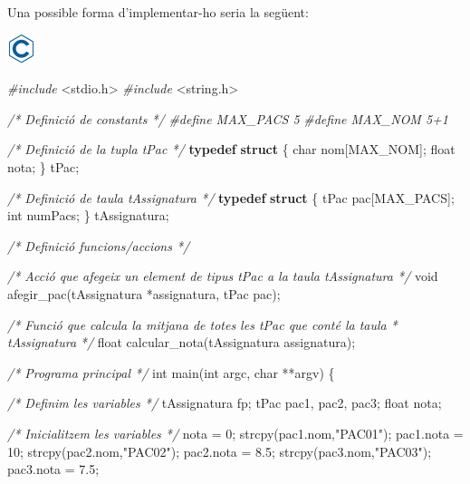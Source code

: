 \documentclass[]{book}
\newenvironment{Shaded}{\begin{snugshade}}{\end{snugshade}}
\newcommand{\KeywordTok}[1]{\textcolor[rgb]{0.13,0.29,0.53}{\textbf{#1}}}
\newcommand{\DataTypeTok}[1]{\textcolor[rgb]{0.13,0.29,0.53}{#1}}
\newcommand{\DecValTok}[1]{\textcolor[rgb]{0.00,0.00,0.81}{#1}}
\newcommand{\FloatTok}[1]{\textcolor[rgb]{0.00,0.00,0.81}{#1}}
\newcommand{\StringTok}[1]{\textcolor[rgb]{0.31,0.60,0.02}{#1}}
\newcommand{\ImportTok}[1]{#1}
\newcommand{\CommentTok}[1]{\textcolor[rgb]{0.56,0.35,0.01}{\textit{#1}}}
\newcommand{\PreprocessorTok}[1]{\textcolor[rgb]{0.56,0.35,0.01}{\textit{#1}}}
\newcommand{\NormalTok}[1]{#1}
\begin{document}
Una possible forma d'implementar-ho seria la següent:

\includegraphics{./img/c.png}

\begin{Shaded}
\begin{Highlighting}[]
\PreprocessorTok{#include }\ImportTok{<stdio.h>}
\PreprocessorTok{#include }\ImportTok{<string.h>}

\CommentTok{/* Definició de constants */}
\PreprocessorTok{#define MAX_PACS 5}
\PreprocessorTok{#define MAX_NOM 5+1}

\CommentTok{/* Definició de la tupla tPac */}
\KeywordTok{typedef} \KeywordTok{struct}\NormalTok{ \{}
    \DataTypeTok{char}\NormalTok{ nom[MAX_NOM];}
    \DataTypeTok{float}\NormalTok{ nota;}
\NormalTok{\} tPac;}

\CommentTok{/* Definició de taula tAssignatura */}
\KeywordTok{typedef} \KeywordTok{struct}\NormalTok{ \{}
\NormalTok{    tPac pac[MAX_PACS];}
    \DataTypeTok{int}\NormalTok{ numPacs;}
\NormalTok{\} tAssignatura;}

\CommentTok{/* Definició funcions/accions */}

\CommentTok{/* Acció que afegeix un element de tipus tPac a la taula tAssignatura */}
\DataTypeTok{void}\NormalTok{ afegir_pac(tAssignatura *assignatura, tPac pac);}

\CommentTok{/* Funció que calcula la mitjana de totes les tPac que conté la taula}
\CommentTok{ * tAssignatura }
\CommentTok{ */}
\DataTypeTok{float}\NormalTok{ calcular_nota(tAssignatura assignatura);}

\CommentTok{/* Programa principal */}
\DataTypeTok{int}\NormalTok{ main(}\DataTypeTok{int}\NormalTok{ argc, }\DataTypeTok{char}\NormalTok{ **argv) \{}

    \CommentTok{/* Definim les variables */}
\NormalTok{    tAssignatura fp;}
\NormalTok{    tPac pac1, pac2, pac3;}
    \DataTypeTok{float}\NormalTok{ nota;}

    \CommentTok{/* Inicialitzem les variables */}
\NormalTok{    nota = }\DecValTok{0}\NormalTok{;}
\NormalTok{    strcpy(pac1.nom,}\StringTok{"PAC01"}\NormalTok{);}
\NormalTok{    pac1.nota = }\DecValTok{10}\NormalTok{;}
\NormalTok{    strcpy(pac2.nom,}\StringTok{"PAC02"}\NormalTok{);}
\NormalTok{    pac2.nota = }\FloatTok{8.5}\NormalTok{;}
\NormalTok{    strcpy(pac3.nom,}\StringTok{"PAC03"}\NormalTok{);}
\NormalTok{    pac3.nota = }\FloatTok{7.5}\NormalTok{;}


\end{Highlighting}
\end{Shaded}
\end{document}

